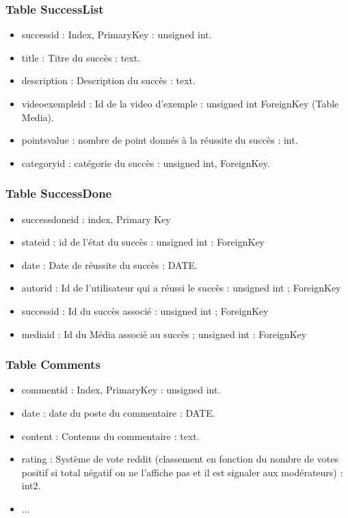 \documentclass[a4paper,10pt]{article}
\begin{document}
\subsubsection{Table SuccessList}

\begin{itemize}
\item successid : Index, PrimaryKey : unsigned int.
\item title : Titre du succès : text.
\item description : Description du succès : text.
\item videoexempleid : Id de la video d'exemple : unsigned int ForeignKey (Table Media).
\item pointsvalue : nombre de point donnés à la réussite du succès : int.
\item categoryid : catégorie du succès : unsigned int, ForeignKey.
\end{itemize}

\subsubsection{Table SuccessDone}

\begin{itemize}
\item successdoneid : index, Primary Key
\item stateid : id de l'état du succès : unsigned int : ForeignKey 
\item date : Date de réussite du succès : DATE.
\item autorid : Id de l'utilisateur qui a réussi le succès : unsigned int ; ForeignKey
\item successid : Id du succès associé : unsigned int ; ForeignKey
\item mediaid : Id du Média associé au succès ; unsigned int : ForeignKey
\end{itemize}

\subsubsection{Table Comments}

\begin{itemize}
\item commentid : Index, PrimaryKey : unsigned int.
\item date : date du poste du commentaire : DATE.
\item content : Contenus du commentaire : text.
\item rating : Système de vote reddit (classement en fonction du nombre de votes positif si total négatif on ne l'affiche pas et il est signaler aux modérateurs) : int2.
\item ...
\end{itemize}
\end{document}
